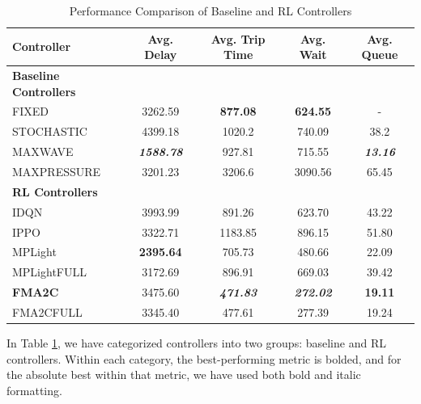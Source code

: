 \begin{table}[h]
    \centering
    \caption{Performance Comparison of Baseline and RL Controllers}
    \label{tab:performance_comparison}
    \begin{tabular}{|lcccc|}
        \hline
        \textbf{Controller} & \textbf{Avg. Delay} & \textbf{Avg. Trip Time} & \textbf{Avg. Wait} & \textbf{Avg. Queue} \\ \hline
        \textbf{Baseline Controllers} & & & & \\ \hline
        FIXED       
        & 3262.59                   
        & \textbf{877.08} 
        & \textbf{624.55} 
        & - \\
        STOCHASTIC  
        & 4399.18                   
        & 1020.2 
        & 740.09 
        & 38.2 \\
        MAXWAVE     
        & \textbf{\textit{1588.78}} 
        & 927.81 
        & 715.55 
        & \textbf{\textit{13.16}} \\
        MAXPRESSURE 
        & 3201.23                   
        & 3206.6 
        & 3090.56 
        & 65.45 \\ \hline
        \textbf{RL Controllers} & & & & \\ \hline
        IDQN        
        & 3993.99                   
        & 891.26 
        & 623.70 
        & 43.22 \\
        IPPO        
        & 3322.71                   
        & 1183.85 
        & 896.15 
        & 51.80 \\
        MPLight     
        & \textbf{2395.64}          
        & 705.73 
        & 480.66 
        & 22.09 \\
        MPLightFULL 
        & 3172.69                   
        & 896.91 
        & 669.03 
        & 39.42 \\
        \textbf{FMA2C}       
        & 3475.60                   
        & \textbf{\textit{471.83}} 
        & \textbf{\textit{272.02}} 
        & \textbf{19.11} \\
        FMA2CFULL   
        & 3345.40                   
        & 477.61 
        & 277.39 
        & 19.24 \\ \hline
    \end{tabular}
\end{table}

\newpage
In Table \ref{tab:performance_comparison}, we have categorized controllers into two groups: baseline and RL controllers. Within each category, the best-performing metric is bolded, and for the absolute best within that metric, we have used both bold and italic formatting.

